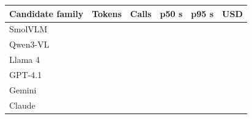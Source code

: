 \begin{tabularx}{\linewidth}{Xrrrrr}
\toprule
Candidate family & Tokens & Calls & p50 s & p95 s & USD\\\midrule
SmolVLM &  &  &  &  & \\
Qwen3-VL &  &  &  &  & \\
Llama 4 &  &  &  &  & \\
GPT-4.1 &  &  &  &  & \\
Gemini &  &  &  &  & \\
Claude &  &  &  &  & \\
\bottomrule
\end{tabularx}
